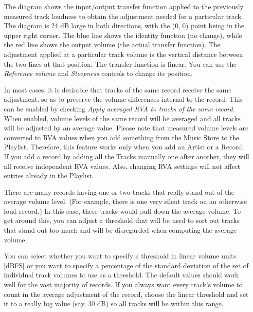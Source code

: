 \documentclass[10pt,english]{article}
\begin{document}
The diagram shows the input/output transfer function
applied to the previously measured track loudness to obtain
the adjustment needed for a particular track. The diagram is
24 dB large in both directions, with the (0, 0) point being in
the upper right corner. The blue line shows the identity
function (no change), while the red line shows the output
volume (the actual transfer function). The adjustment applied
at a particular track volume is the vertical distance between
the two lines at that position. The transfer function is
linear. You can use the \textsl{Reference volume} and
\textsl{Steepness} controls to change its position.




In most cases, it is desirable that tracks of the same
record receive the same adjustment, so as to preserve the
volume differences internal to the record. This can be enabled
by checking \textsl{Apply averaged RVA to tracks of the same
record}. When enabled, volume levels of the same record
will be averaged and all tracks will be adjusted by an average
value. Please note that measured volume levels are converted
to RVA values when you add something from the Music Store to
the Playlist. Therefore, this feature works only when you add
an Artist or a Record. If you add a record by adding all the
Tracks manually one after another, they will all receive
independent RVA values. Also, changing RVA settings will not
affect entries already in the Playlist.




There are many records having one or two tracks that really
stand out of the average volume level. (For example, there is
one very silent track on an otherwise loud record.)  In this
case, these tracks would pull down the average volume. To get
around this, you can adjust a threshold that will be used to
sort out tracks that stand out too much and will be
disregarded when computing the average volume.




You can select whether you want to specify a threshold in
linear volume units [dBFS] or you want to specify a percentage
of the standard deviation of the set of individual track
volumes to use as a threshold. The default values should work
well for the vast majority of records. If you always want
every track's volume to count in the average adjustment of the
record, choose the linear threshold and set it to a really big
value (say, 30 dB) so all tracks will be within this
range.
\end{document}
